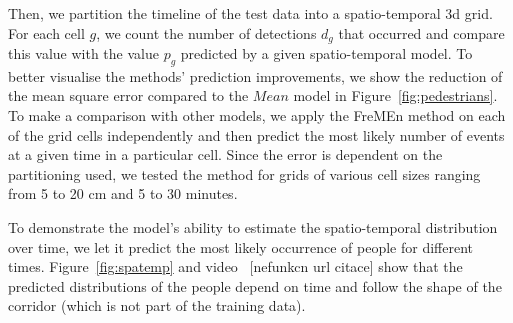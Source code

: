 Then, we partition the timeline of the test data into a spatio-temporal 3d grid.
For each cell $g$, we count the number of detections $d_g$ that occurred and compare this value with the value $p_g$ predicted by a given spatio-temporal model.
To better visualise the methods' prediction improvements, we show the reduction of the mean square error compared to the $Mean$ model in Figure~\ref{fig:pedestrians}.
To make a comparison with other models, we apply the FreMEn method on each of the grid cells independently and then predict the most likely number of events at a given time in a particular cell.
Since the error is dependent on the partitioning used, we tested the method for grids of various cell sizes ranging from 5 to 20 cm and 5 to 30 minutes.

To demonstrate the model's ability to estimate the spatio-temporal distribution over time, we let it predict the most likely occurrence of people for different times.  
Figure~\ref{fig:spatemp} and video~\cite{video} [nefunkcn url citace] show that the predicted distributions of the people depend on time and follow the shape of the corridor (which is not part of the training data). 

